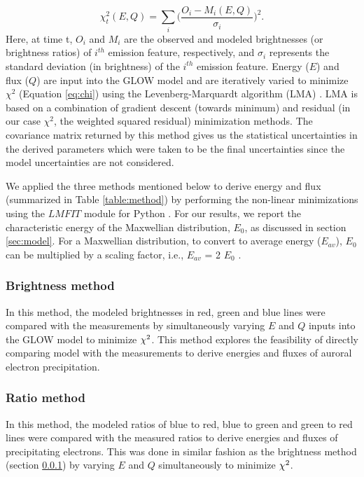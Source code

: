 \begin{equation}
\chi^{2}_t (E,Q) = \sum_{i}\Bigg({\frac{O_{i} - M_{i} (E,Q)} {\sigma_{i}}}\Bigg)^{2}.
\label{eq:chi}
\end{equation}
Here, at time t, $O_{i}$ and $M_{i}$ are the observed and modeled brightnesses (or brightness ratios) of $ i^{th}$ emission feature, respectively, and $\sigma_{i}$ represents the standard deviation (in brightness) of the $ i^{th}$ emission feature. Energy ($E$) and flux ($Q$) are input into the GLOW model and are iteratively varied to minimize $\chi^2$ (Equation \ref{eq:chi}) using the Levenberg-Marquardt algorithm (LMA) \citep{levenberg,marquardt}. LMA is based on a combination of gradient descent (towards minimum) and residual (in our case $\chi^2$, the weighted squared residual) minimization methods. The covariance matrix returned by this method gives us the statistical uncertainties in the derived parameters which were taken to be the final uncertainties since the model uncertainties are not considered. 

We applied the three methods mentioned below to derive energy and flux (summarized in Table \ref{table:method}) by performing the non-linear minimizations using the $LMFIT$ module for Python \citep{lmfit}. For our results, we report the characteristic energy of the Maxwellian distribution, $E_0$, as discussed in section \ref{sec:model}. For a Maxwellian distribution, to convert to average energy ($E_{av}$), $E_0$ can be multiplied by a scaling factor, i.e., $E_{av}$ = 2 $E_0$ \citep{kosch_2001}.
\subsubsection{Brightness method}
\label{sec:brightness}
In this method, the modeled brightnesses in red, green and blue lines were compared with the measurements by simultaneously varying $E$ and $Q$ inputs into the GLOW model to minimize $\rm \chi^2$. This method explores the feasibility of directly comparing model with the measurements to derive energies and fluxes of auroral electron precipitation.

\subsubsection{Ratio method}
\label{sec:ratio}
In this method, the modeled ratios of blue to red, blue to green and green to red lines were compared with the measured ratios to derive energies and fluxes of precipitating electrons. This was done in similar fashion as the brightness method (section \ref{sec:brightness}) by varying $E$ and $Q$ simultaneously to minimize $\rm \chi^2$. 


